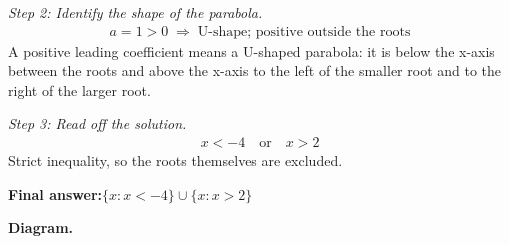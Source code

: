 \documentclass[11pt]{article}
\begin{document}
\textit{Step 2: Identify the shape of the parabola.}
\[\begin{gathered}
a = 1 > 0 \;\Longrightarrow\; \text{U-shape; positive outside the roots}
\end{gathered}\]
A positive leading coefficient means a U-shaped parabola: it is below the x-axis between the roots and above the x-axis to the left of the smaller root and to the right of the larger root.

\textit{Step 3: Read off the solution.}
\[\begin{gathered}
x < -4 \quad \text{or} \quad x > 2
\end{gathered}\]
Strict inequality, so the roots themselves are excluded.

\begin{answerbox}
\textbf{Final answer:}\quad \(\displaystyle \{ x : x < -4 \} \cup \{ x : x > 2 \}\)
\end{answerbox}
\textbf{Diagram.}
\end{document}
